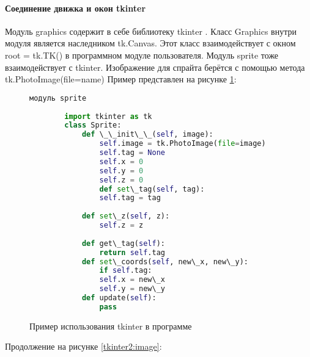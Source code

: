\paragraph{Соединение движка и окон tkinter}
Модуль graphics содержит в себе библиотеку tkinter . Класс Graphics внутри модуля является наследником tk.Canvas. Этот класс взаимодействует с окном root = tk.TK() в программном модуле пользователя. Модуль sprite тоже взаимодействует с tkinter. Изображение для спрайта берётся с помощью метода tk.PhotoImage(file=name)
Пример представлен на рисунке \ref{tk:image}:
\begin{figure}[H]
	\begin{lstlisting}[language=Python]
		модуль sprite
		
		import tkinter as tk
		class Sprite:
			def \_\_init\_\_(self, image):
				self.image = tk.PhotoImage(file=image)
				self.tag = None
				self.x = 0
				self.y = 0
				self.z = 0		
				def set\_tag(self, tag):
				self.tag = tag
			
			def set\_z(self, z):
				self.z = z
			
			def get\_tag(self):
				return self.tag	
			def set\_coords(self, new\_x, new\_y):
				if self.tag:
				self.x = new\_x
				self.y = new\_y
			def update(self):
				pass
	\end{lstlisting}  
	\caption{Пример использования tkinter в программе}
	\label{tk:image}
\end{figure}
Продолжение на рисунке \ref{tkinter2:image}:
